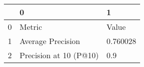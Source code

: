 \begin{tabular}{lll}
\toprule
{} &                       0 &         1 \\
\midrule
0 &                  Metric &     Value \\
1 &       Average Precision &  0.760028 \\
2 &  Precision at 10 (P@10) &       0.9 \\
\bottomrule
\end{tabular}
